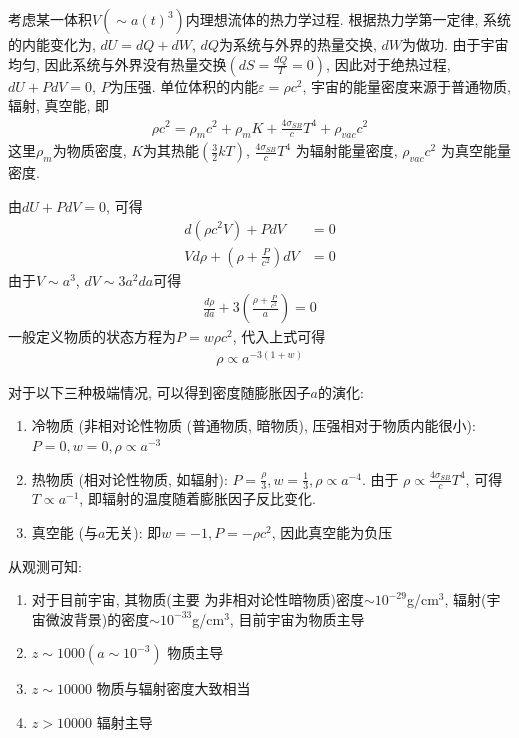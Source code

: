 考虑某一体积$V(\sim a(t)^3)$内理想流体的热力学过程. 根据热力学第一定律, 系统的内能变化为, $dU=dQ+dW$, $dQ$为系统与外界的热量交换, $dW$为做功. 由于宇宙均匀, 因此系统与外界没有热量交换$(dS=\frac{dQ}{T}=0)$, 因此对于绝热过程, $dU+PdV=0$, $P$为压强. 单位体积的内能$\varepsilon=\rho c^2$, 宇宙的能量密度来源于普通物质, 辐射, 真空能, 即
\begin{align*}
    \rho c^2=\rho_m c^2+\rho_m K+\frac{4\sigma_{SB}}{c}T^4+\rho_{vac}c^2
\end{align*}
这里$\rho_m$为物质密度, $K$为其热能$\left(\frac{3}{2}kT\right)$, $\frac{4\sigma_{SB}}{c}T^4$ 为辐射能量密度,  $\rho_{vac}c^2$ 为真空能量密度. 

由$dU+PdV=0$, 可得
\begin{align*}
    d(\rho c^2 V)+Pd V&=0\\
    Vd \rho + \left(\rho +\frac{P}{c^2}\right)d V&=0
\end{align*}
由于$V\sim a^3$, $dV\sim 3a^2da$可得
\begin{align*}
    \frac{d\rho}{da}+3\left( \frac{\rho+\frac{P}{c^2}}{a} \right)=0
\end{align*}
一般定义物质的状态方程为$P=w\rho c^2$, 代入上式可得
\begin{align*}
    \rho \propto a^{-3(1+w)}
\end{align*}

对于以下三种极端情况, 可以得到密度随膨胀因子$a$的演化:
\begin{enumerate}\small
    \item 冷物质 (非相对论性物质 (普通物质, 暗物质), 压强相对于物质内能很小): $P=0, w=0, \rho \propto a^{-3}$
    \item 热物质 (相对论性物质, 如辐射): $P=\frac{\rho}{3}, w=\frac{1}{3}, \rho\propto a^{-4}$. 由于 $\rho\propto \frac{4\sigma_{SB}}{c}T^4$, 可得 $T\propto a^{-1}$, 即辐射的温度随着膨胀因子反比变化. 
    \item 真空能 (与$a$无关): 即$w=-1, P=-\rho c^2$, 因此真空能为负压
\end{enumerate}

从观测可知: 
\begin{enumerate}\small
    \item 对于目前宇宙, 其物质(主要
    为非相对论性暗物质)密度$\sim 10^{-29}$g/cm${}^3$, 辐射(宇宙微波背景)的密度$\sim 10^{-33}$g/cm${}^3$, 目前宇宙为物质主导
    \item $z\sim 1000(a\sim 10^{-3})$ 物质主导
    \item $z\sim 10000$ 物质与辐射密度大致相当
    \item $z>10000$ 辐射主导
\end{enumerate}


